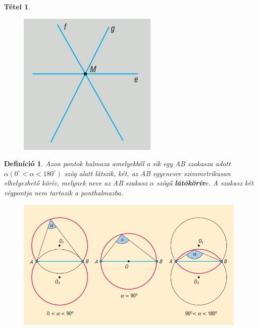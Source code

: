 \documentclass[12pt,a4paper]{article}
\newtheorem{theorem}{Tétel} [section]
\newtheorem{definition}{Definíció} [section]
\begin{document}
\begin{theorem}
\begin{itemize}
\begin{figure}[h]
\centering
\includegraphics[scale=0.4]{img/harom_egyenes_3}
\end{figure}
\end{itemize}
\end{theorem}
\newpage
\begin{definition}
Azon pontok halmaza amelyekből a sík egy AB szakasza adott $\alpha (0^\circ < \alpha < 180^\circ)$ szög alatt látszik, két, az AB egyenesre szimmetrikusan elhelyezhető körív, melynek neve az AB szakasz $\alpha$ szögű \textbf{látókörív}e. A szakasz két végpontja nem tartozik a ponthalmazba.
\end{definition}
\begin{figure}[h]
\centering
\includegraphics[scale=0.3]{geometry/latorkoriv}
\end{figure}
\end{document}
